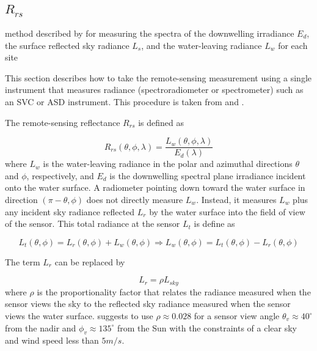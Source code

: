\begin{appendices}
\section{$R_{rs}$}

method described by \cite{Mobley:1999} for measuring the spectra of the downwelling irradiance $E_d$, the surface reflected sky radiance $L_s$, and the water-leaving radiance $L_w$ for each site 

This section describes how to take the remote-sensing measurement using a single instrument that measures radiance (spectroradiometer or spectrometer) such as an SVC or ASD instrument. This procedure is taken from \cite{Mobley:1999} and \cite{Mueller1995}. 

The remote-sensing reflectance $R_{rs}$ is defined as

\begin{equation}\label{eq:Rrs}
	R_{rs}(\theta,\phi,\lambda)=\frac{L_w(\theta,\phi,\lambda)}{E_d(\lambda)}
\end{equation}
where $L_w$ is the water-leaving radiance in the polar and azimuthal directions $\theta$ and $\phi$, respectively, and $E_d$ is the downwelling spectral plane irradiance incident onto the water surface. A radiometer pointing down toward the water surface in direction $(\pi-\theta,\phi)$ does not directly measure $L_w$. Instead, it measures $L_w$  plus any incident sky radiance reflected $L_r$ by the water surface into the field of view of the sensor. This total radiance at the sensor $L_t$ is define as

\begin{equation}\label{eq:Lt}
	L_t(\theta,\phi) = L_r(\theta,\phi)+L_w(\theta,\phi)\Rightarrow L_w(\theta,\phi)=L_t(\theta,\phi) - L_r(\theta,\phi)
\end{equation}

The term $L_r$ can be replaced by

\begin{equation}\label{eq:Lsky}
	L_r = \rho L_{sky}
\end{equation}
where $\rho$ is the proportionality factor that relates the radiance measured when the sensor views the sky to the reflected sky radiance measured when the sensor views the water surface. \cite{Mobley:1999} suggests to use $\rho \approx 0.028$ for a sensor view angle $\theta_v \approx 40^\circ$ from the nadir and  $\phi_v \approx 135^\circ$ from the Sun with the constraints of a clear sky and wind speed less than $5m/s$.


\end{appendices}
